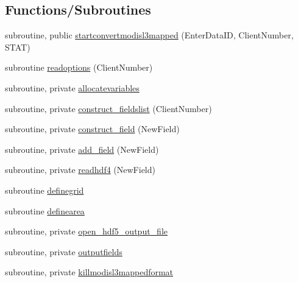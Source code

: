 \subsection*{Functions/\+Subroutines}
\begin{DoxyCompactItemize}
\item 
subroutine, public \mbox{\hyperlink{namespacemoduleconvertmodisl3mapped_a18d5802527fa5553ab45a5c110557d2b}{startconvertmodisl3mapped}} (Enter\+Data\+ID, Client\+Number, S\+T\+AT)
\item 
subroutine \mbox{\hyperlink{namespacemoduleconvertmodisl3mapped_a0f034c5b727c268c416d8c9dfec265e3}{readoptions}} (Client\+Number)
\item 
subroutine, private \mbox{\hyperlink{namespacemoduleconvertmodisl3mapped_ac229afc3a01cac186e0abd3c19093d2a}{allocatevariables}}
\item 
subroutine, private \mbox{\hyperlink{namespacemoduleconvertmodisl3mapped_a9ccec60dccec78cdbd1bb6e2b82e4c6b}{construct\+\_\+fieldslist}} (Client\+Number)
\item 
subroutine, private \mbox{\hyperlink{namespacemoduleconvertmodisl3mapped_a74d74f88259002bec089959db1c1370b}{construct\+\_\+field}} (New\+Field)
\item 
subroutine, private \mbox{\hyperlink{namespacemoduleconvertmodisl3mapped_a3fa5a2918388eb33951d0fcae3d4bbb6}{add\+\_\+field}} (New\+Field)
\item 
subroutine, private \mbox{\hyperlink{namespacemoduleconvertmodisl3mapped_a848303d0a614c18b94629b24f417fee7}{readhdf4}} (New\+Field)
\item 
subroutine \mbox{\hyperlink{namespacemoduleconvertmodisl3mapped_a82cd68f8503b3a5bf96e529ac4715405}{definegrid}}
\item 
subroutine \mbox{\hyperlink{namespacemoduleconvertmodisl3mapped_aa45a197b9dfbeea974438b114ede6c92}{definearea}}
\item 
subroutine, private \mbox{\hyperlink{namespacemoduleconvertmodisl3mapped_ae7ff1f4d8258c08682ea6db04a074c74}{open\+\_\+hdf5\+\_\+output\+\_\+file}}
\item 
subroutine, private \mbox{\hyperlink{namespacemoduleconvertmodisl3mapped_ac1aafb9181d66e361d34ec58c03d59bb}{outputfields}}
\item 
subroutine, private \mbox{\hyperlink{namespacemoduleconvertmodisl3mapped_a92c7eb5c01d20a3540cef8d0d437bb08}{killmodisl3mappedformat}}
\end{DoxyCompactItemize}
